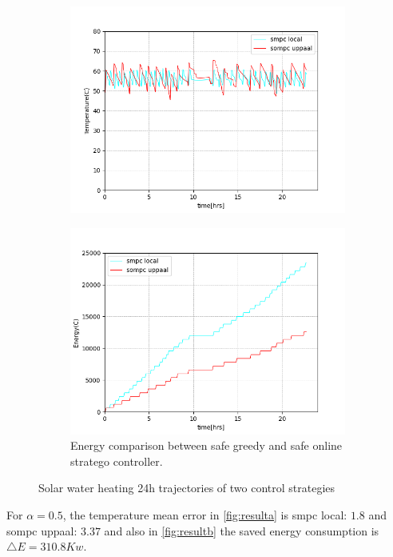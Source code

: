         \begin{figure}[!htb]        
          \begin{subfigure}{0.51\textwidth}
            \includegraphics[width=1.0\linewidth]{images/controllers}
             \label{fig:resulta}
          \end{subfigure}
          \hspace*{\fill}
          \begin{subfigure}{0.51\textwidth}
              \includegraphics[width=1.0\linewidth]{images/energycomparison.png}
              \caption{Energy comparison between safe greedy and safe online stratego
              controller.} \label{fig:resultb}
          \end{subfigure}%
          \caption{Solar water heating 24h trajectories of two control strategies}
        \end{figure}

      For $\alpha = 0.5$, the temperature mean error in \autoref{fig:resulta} is 
      smpc local:  $1.8$ and sompc uppaal:  $3.37$ and also in \autoref{fig:resultb} 
      the saved energy consumption is $ \bigtriangleup E = 310.8Kw$. %
        
